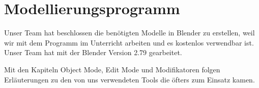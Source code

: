 \section{Modellierungsprogramm}
Unser Team hat beschlossen die benötigten Modelle in Blender zu erstellen, weil wir mit dem Programm im Unterricht arbeiten und
es kostenlos verwendbar ist. Unser Team hat mit der Blender Version 2.79 gearbeitet.

Mit den Kapiteln Object Mode, Edit Mode und Modifikatoren folgen Erläuterungen zu
den von uns verwendeten Tools die öfters zum Einsatz kamen.
